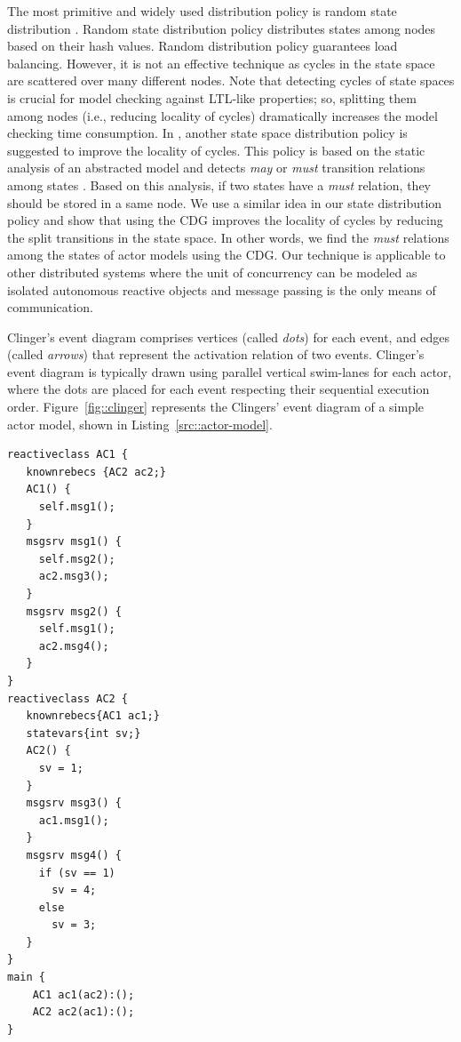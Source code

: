 The most primitive and widely used distribution policy is random state distribution \cite{DBLP:journals/entcs/GaravelMS13}. Random state distribution policy distributes states among nodes based on their hash values. Random distribution policy guarantees load balancing. However, it is not an effective technique as cycles in the state space are scattered over many different nodes. Note that detecting cycles of state spaces is crucial for model checking against LTL-like properties; so, splitting them among nodes (i.e., reducing locality of cycles) dramatically increases the model checking time consumption. In \cite{DBLP:journals/entcs/OrzanPE05}, another state space distribution policy is suggested to improve the locality of cycles. This policy is based on the static analysis of an abstracted model and detects \emph{may} or \emph{must} transition relations among states \cite{DBLP:conf/lics/LarsenT88}.
Based on this analysis, if two states have a \emph{must} relation, they should be stored in a same node. We use a similar idea in our state distribution policy and show that using the CDG improves the locality of cycles by reducing the split transitions in the state space. In other words, we find the \emph{must} relations among the states of actor models using the CDG. Our technique is applicable to other distributed systems where the unit of concurrency can be modeled as isolated autonomous reactive objects and message passing is the only means of communication. 

Clinger's event diagram comprises vertices (called \emph{dots}) for each event, and edges (called \emph{arrows}) that represent the activation relation of two events. Clinger's event diagram is typically drawn using parallel vertical swim-lanes for each actor, where the dots are placed for each event respecting their sequential execution order. Figure~\ref{fig::clinger} represents the Clingers' event diagram of a simple actor model, shown in Listing~\ref{src::actor-model}. 

\begin{lstlisting}[language=rebeca, caption= A simple actor model, label=src::actor-model]
reactiveclass AC1 {
   knownrebecs {AC2 ac2;}
   AC1() {
     self.msg1();
   }
   msgsrv msg1() {
     self.msg2();
     ac2.msg3();
   }
   msgsrv msg2() {
     self.msg1();
     ac2.msg4();
   }
}
reactiveclass AC2 {
   knownrebecs{AC1 ac1;}
   statevars{int sv;}
   AC2() {
     sv = 1;
   }
   msgsrv msg3() {
     ac1.msg1();
   }
   msgsrv msg4() {
     if (sv == 1)
       sv = 4;
     else
       sv = 3;
   }
}
main {
    AC1 ac1(ac2):();
    AC2 ac2(ac1):();
}
\end{lstlisting}

